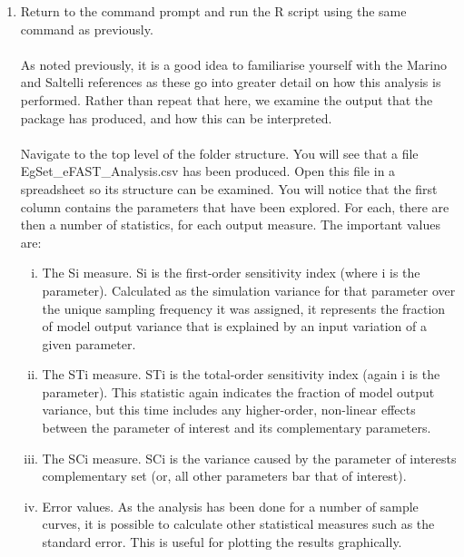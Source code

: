 \documentclass[a4paper,11pt]{article}
\begin{document}
\begin{enumerate}
\item Return to the command prompt and run the R script using the same command as previously.\\
\\
As noted previously, it is a good idea to familiarise yourself with the Marino and Saltelli references as these go into greater detail on how this analysis is performed. Rather than repeat that here, we examine the output that the package has produced, and how this can be interpreted.\\
\\
Navigate to the top level of the folder structure. You will see that a file EgSet\_eFAST\_Analysis.csv has been produced. Open this file in a spreadsheet so its structure can be examined.  You will notice that the first column contains the parameters that have been explored.  For each, there are then a number of statistics, for each output measure. The important values are:
\begin{enumerate}[(i)]
\item The Si measure.  Si is the first-order sensitivity index (where i is the parameter).  Calculated as the simulation variance for that parameter over the unique sampling frequency it was assigned, it represents the fraction of model output variance that is explained by an input variation of a given parameter.
\item The STi measure. STi is the total-order sensitivity index (again i is the parameter).  This statistic again indicates the fraction of model output variance, but this time includes any higher-order, non-linear effects between the parameter of interest and its complementary parameters.
\item The SCi measure. SCi is the variance caused by the parameter of interests complementary set (or, all other parameters bar that of interest).
\item Error values.  As the analysis has been done for a number of sample curves, it is possible to calculate other statistical measures such as the standard error. This is useful for plotting the results graphically.
\end{enumerate}


\end{enumerate}
\end{document}

